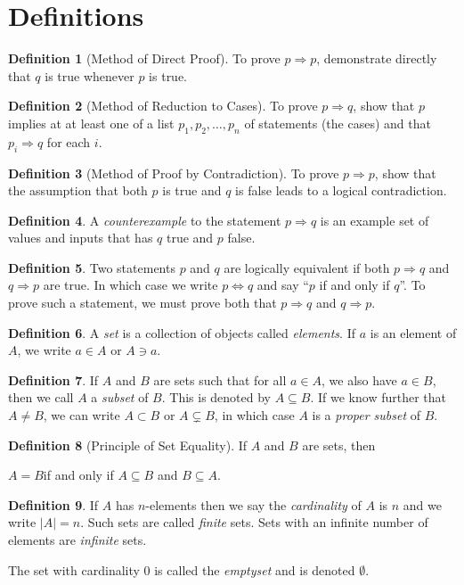 \documentclass[12pt]{article}
\theoremstyle{definition}
\newtheorem*{defn}{Definition}
\begin{document}
\section*{Definitions}
\begin{defn}[Method of Direct Proof]
	To prove $p\Rightarrow p$, demonstrate directly that $q$ is true whenever $p$ is true.
\end{defn}
\begin{defn}[Method of Reduction to Cases]
	To prove $p\Rightarrow q$, show that $p$ implies at at least one of a list $p_1,p_2,\dots,p_n$ of statements (the cases) and that $p_i\Rightarrow q$ for each $i$.
\end{defn}
\begin{defn}[Method of Proof by Contradiction]
	To prove $p\Rightarrow p$, show that the assumption that both $p$ is true and $q$ is false leads to a logical contradiction.
\end{defn}
\begin{defn}
	A \emph{counterexample} to the statement $p\Rightarrow q$ is an example set of values and inputs that has $q$ true and $p$ false.
\end{defn}
\begin{defn}
	Two statements $p$ and $q$ are logically equivalent if both $p\Rightarrow q$ and $q\Rightarrow p$ are true.  In which case we write $p\Leftrightarrow q$ and say ``$p$ if and only if $q$''. To prove such a statement, we must prove both that $p\Rightarrow q$ and $q\Rightarrow p$.
\end{defn}
\begin{defn}
	A \emph{set} is a collection of objects called \emph{elements}.  If $a$ is an element of $A$, we write $a\in A$ or $A\ni a$.
\end{defn}
\begin{defn}
	If $A$ and $B$ are sets such that for all $a\in A$, we also have $a\in B$, then we call $A$ a \emph{subset} of $B$.  This is denoted by $A\subseteq B$. If we know further that $A\neq B$, we can write $A\subset B$ or $A\subsetneq B$, in which case $A$ is a \emph{proper subset} of $B$.
\end{defn}
\begin{defn}[Principle of Set Equality]
	If $A$ and $B$ are sets, then
	\begin{center}
		$A=B$\quad if and only if $A\subseteq B$ and $B\subseteq A$.
	\end{center}
\end{defn}
\begin{defn}
	If $A$ has $n$-elements then we say the \emph{cardinality} of $A$ is $n$ and we write $|A|=n$. Such sets are called \emph{finite} sets.  
	Sets with an infinite number of elements are \emph{infinite} sets.
	
	The set with cardinality 0 is called the \emph{emptyset} and is denoted $\emptyset$.
\end{defn}
\end{document}
